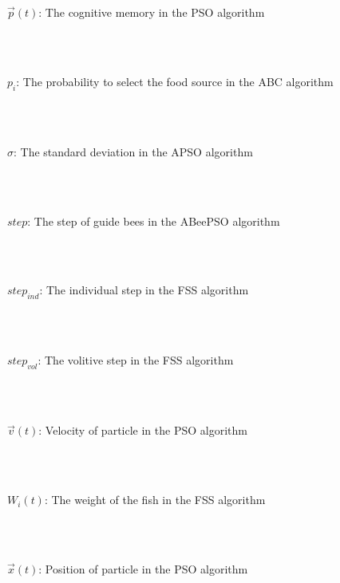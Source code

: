 \begin{tabbing}
\parbox{5in}{$\vec p(t)$: The cognitive memory in the PSO algorithm\dotfill \pageref{eq:PSO_velocity}}\\
\\
\parbox{5in}{$p_i$: The probability to select the food source in the ABC algorithm\dotfill \pageref{eq:ABC_probability}}\\
\\
\parbox{5in}{$\sigma$: The standard deviation in the APSO algorithm\dotfill \pageref{eq:apso_sigma}}\\
\\
\parbox{5in}{$step$: The step of guide bees in the ABeePSO algorithm\dotfill \pageref{eq:ABeePSO_Step}}\\
\\
\parbox{5in}{$step_{ind}$: The individual step in the FSS algorithm\dotfill \pageref{eq:FSS_stepInd}}\\
\\
\parbox{5in}{$step_{vol}$: The volitive step in the FSS algorithm\dotfill \pageref{eq:FSS_stepVol}}\\
\\
\parbox{5in}{$\vec v(t)$: Velocity of particle in the PSO algorithm\dotfill \pageref{eq:PSO_velocity}}\\
\\
\parbox{5in}{$W_i(t)$: The weight of the fish in the FSS algorithm\dotfill \pageref{eq:FSS_feed}}\\
\\
\parbox{5in}{$\vec x(t)$: Position of particle in the PSO algorithm\dotfill \pageref{eq:PSO_position}}\\

\end{tabbing}
